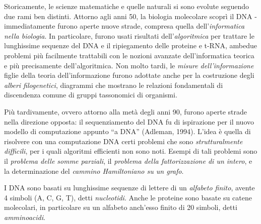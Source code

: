\documentclass[10pt]{book}
\begin{document}
Storicamente, le scienze matematiche e quelle naturali si sono evolute seguendo
due rami ben distinti. Attorno agli anni 50, la biologia molecolare scoprì il
DNA \-- immediatamente furono aperte nuove strade, compresa quella
dell'\emph{informatica nella biologia}. In particolare, furono usati risultati
dell'\emph{algoritmica} per trattare le lunghissime sequenze del DNA e il
ripiegamento delle proteine e t-RNA, ambedue problemi più facilmente trattabili
con le nozioni avanzate dell'informatica teorica e più precisamente
dell'algoritmica. Non molto tardi, le \emph{misure dell'informazione} figlie
della teoria dell'informazione furono adottate anche per la costruzione degli
\emph{alberi filogenetici}, diagrammi che mostrano le relazioni fondamentali di
discendenza comune di gruppi tassonomici di organismi. 

Più tardivamente, ovvero attorno alla metà degli anni 90, furono aperte strade
nella direzione opposta: il sequenziamento del DNA fu di ispirazione per il
nuovo modello di computazione appunto ``a DNA'' (Adleman, 1994). L'idea è
quella di risolvere con una computazione DNA certi problemi che sono
\emph{strutturalmente difficili}, per i quali algoritmi efficienti non sono
noti. Esempi di tali problemi sono il \emph{problema delle somme parziali}, il
\emph{problema della fattorizzazione di un intero}, e la determinazione del
\emph{cammino Hamiltoniano su un grafo}.

I DNA sono basati su lunghissime sequenze di lettere di un \emph{alfabeto
finito}, avente 4 simboli (A, C, G, T), detti \emph{nucleotidi}. Anche le
proteine sono basate su catene molecolari, in particolare su un alfabeto
anch'esso finito di 20 simboli, detti \emph{amminoacidi}.
\end{document}
